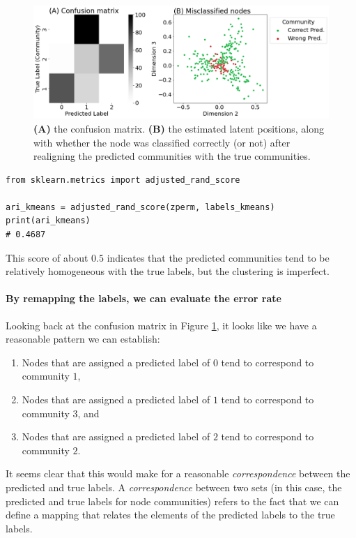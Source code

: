\begin{figure}[h]
    \centering
    \includegraphics[width=\linewidth]{applications/ch7/Images/comm_detect_eval.png}
    \caption[Community detection clustering evaluation]{\textbf{(A)} the confusion matrix. \textbf{(B)} the estimated latent positions, along with whether the node was classified correctly (or not) after realigning the predicted communities with the true communities.}
    \label{fig:ch7:comm_detect:eval}
\end{figure}

\begin{lstlisting}[style=python]
from sklearn.metrics import adjusted_rand_score

ari_kmeans = adjusted_rand_score(zperm, labels_kmeans)
print(ari_kmeans)
# 0.4687
\end{lstlisting}
This score of about $0.5$ indicates that the predicted communities tend to be relatively homogeneous with the true labels, but the clustering is imperfect.


\paragraph*{By remapping the labels, we can evaluate the error rate}

Looking back at the confusion matrix in Figure \ref{fig:ch7:comm_detect:eval}, it looks like we have a reasonable pattern we can establish:
\begin{enumerate}
    \item Nodes that are assigned a predicted label of $0$ tend to correspond to community $1$, 
    \item Nodes that are assigned a predicted label of $1$ tend to correspond to community $3$, and
    \item Nodes that are assigned a predicted label of $2$ tend to correspond to community $2$.
\end{enumerate}
It seems clear that this would make for a reasonable \textit{correspondence} between the predicted and true labels. A \textit{correspondence} between two sets (in this case, the predicted and true labels for node communities) refers to the fact that we can define a mapping that relates the elements of the predicted labels to the true labels. 

